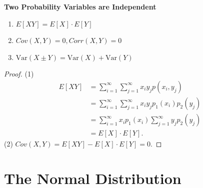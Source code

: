 \documentclass[12pt,a4paper]{article}
\newcommand{\Var}{\text{Var}}
\newcommand{\Cov}{\textit{Cov}}
\newcommand{\Corr}{\textit{Corr}}
\begin{document}
\begin{tcolorbox}[colback=white]\begin{center}
	\textbf{Two Probability Variables are Independent}
\end{center}\begin{enumerate}
	\item \(E[XY]=E[X]\cdot E[Y] \)
	\item \(\Cov(X,Y)=0, \Corr(X,Y)=0 \)
	\item \(\Var(X\pm Y)=\Var(X)+\Var(Y) \)
\end{enumerate}\begin{proof}
	(1) \begin{align*}
		E[XY] &= \sum_{i=1}^\infty\sum_{j=1}^\infty x_iy_jp(x_i,y_j) \\
		&= \sum_{i=1}^\infty\sum_{j=1}^\infty x_iy_jp_1(x_i)p_2(y_j) \\
		&= \sum_{i=1}^\infty x_ip_1(x_i)\sum_{j=1}^\infty y_jp_2(y_j)  \\
		&=E[X]\cdot E[Y].
	\end{align*} 
	(2) $\Cov(X,Y) = E[XY]-E[X]\cdot E[Y]=0$.
\end{proof}

\end{tcolorbox}

\section{The Normal Distribution}
\end{document}

